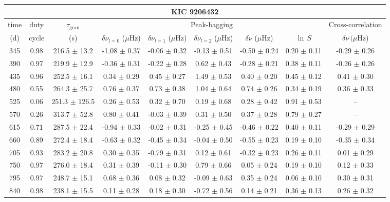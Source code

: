 \documentclass[twocolumn]{aastex61}%
\begin{document}
\begin{table*}[ht]\centering\fontsize{9.}{7.}\selectfont
\begin{tabular}{ccc|ccccc|c}
\multicolumn{9}{c}{KIC 9206432}\\ \hline\hline
time & duty & $\tau_\text{gran}$ &\multicolumn{5}{c|}{Peak-bagging}&Cross-correlation\\
(d)& cycle & (s)&$\delta\nu_{l=0}$ ($\mu$Hz) & $\delta\nu_{l=1}$ ($\mu$Hz) & $\delta\nu_{l=2}$ ($\mu$Hz) & $\delta\nu$ ($\mu$Hz)& $\ln\,S$ & $\delta\nu\,(\mu$Hz)\\\hline
345 & 0.98 & 216.5 $\pm$ 13.2 & -1.08 $\pm$ 0.37 & -0.06 $\pm$ 0.32 & -0.13 $\pm$ 0.51 & -0.50 $\pm$ 0.24 & 0.20 $\pm$ 0.11 & -0.29 $\pm$ 0.26\\
390 & 0.97 & 219.9 $\pm$ 12.9 & -0.36 $\pm$ 0.31 & -0.22 $\pm$ 0.28 & 0.62 $\pm$ 0.43 & -0.28 $\pm$ 0.21 & 0.38 $\pm$ 0.11 & -0.26 $\pm$ 0.26\\
435 & 0.96 & 252.5 $\pm$ 16.1 & 0.34 $\pm$ 0.29 & 0.45 $\pm$ 0.27 & 1.49 $\pm$ 0.53 & 0.40 $\pm$ 0.20 & 0.45 $\pm$ 0.12 & 0.41 $\pm$ 0.30\\
480 & 0.55 & 264.3 $\pm$ 25.7 & 0.76 $\pm$ 0.37 & 0.73 $\pm$ 0.38 & 1.04 $\pm$ 0.64 & 0.74 $\pm$ 0.26 & 0.34 $\pm$ 0.19 & 0.36 $\pm$ 0.33\\
525 & 0.06 & 251.3 $\pm$ 126.5 & 0.26 $\pm$ 0.53 & 0.32 $\pm$ 0.70 & 0.19 $\pm$ 0.68 & 0.28 $\pm$ 0.42 & 0.91 $\pm$ 0.53 & --\\
570 & 0.26 & 313.7 $\pm$ 52.8 & 0.80 $\pm$ 0.41 & -0.03 $\pm$ 0.39 & 0.31 $\pm$ 0.50 & 0.37 $\pm$ 0.28 & 0.79 $\pm$ 0.27 & --\\
615 & 0.71 & 287.5 $\pm$ 22.4 & -0.94 $\pm$ 0.33 & -0.02 $\pm$ 0.31 & -0.25 $\pm$ 0.45 & -0.46 $\pm$ 0.22 & 0.40 $\pm$ 0.11 & -0.29 $\pm$ 0.29\\
660 & 0.89 & 272.4 $\pm$ 18.4 & -0.63 $\pm$ 0.32 & -0.45 $\pm$ 0.34 & -0.04 $\pm$ 0.50 & -0.55 $\pm$ 0.23 & 0.19 $\pm$ 0.10 & -0.35 $\pm$ 0.34\\
705 & 0.93 & 283.2 $\pm$ 20.8 & 0.30 $\pm$ 0.35 & -0.79 $\pm$ 0.31 & 0.12 $\pm$ 0.61 & -0.32 $\pm$ 0.23 & 0.26 $\pm$ 0.11 & 0.01 $\pm$ 0.29\\
750 & 0.97 & 276.0 $\pm$ 18.4 & 0.31 $\pm$ 0.39 & -0.11 $\pm$ 0.30 & 0.79 $\pm$ 0.66 & 0.05 $\pm$ 0.24 & 0.19 $\pm$ 0.10 & 0.12 $\pm$ 0.33\\
795 & 0.97 & 248.7 $\pm$ 15.1 & 0.68 $\pm$ 0.36 & 0.08 $\pm$ 0.32 & -0.09 $\pm$ 0.63 & 0.35 $\pm$ 0.24 & 0.06 $\pm$ 0.10 & 0.30 $\pm$ 0.31\\
840 & 0.98 & 238.1 $\pm$ 15.5 & 0.11 $\pm$ 0.28 & 0.18 $\pm$ 0.30 & -0.72 $\pm$ 0.56 & 0.14 $\pm$ 0.21 & 0.36 $\pm$ 0.13 & 0.26 $\pm$ 0.32\\

\end{tabular}
\end{table*}
\end{document}
